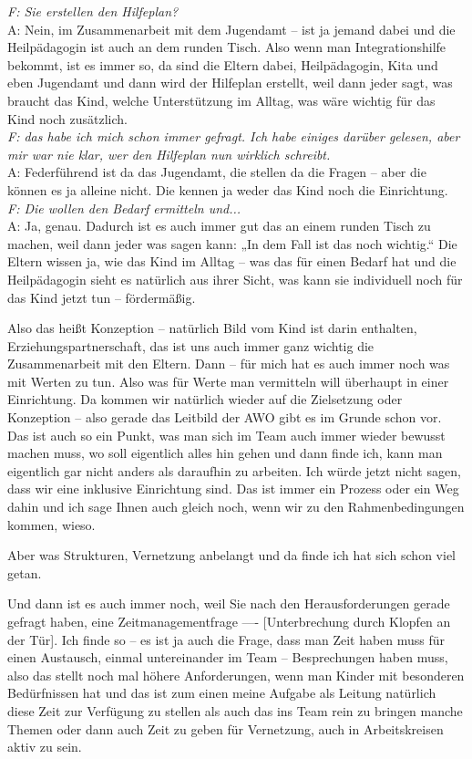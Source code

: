 \begin{linenumbers*}
\emph{F: Sie erstellen den Hilfeplan?}\\
A: Nein, im Zusammenarbeit mit dem Jugendamt -- ist ja jemand dabei und die Heilpädagogin ist auch an dem runden Tisch. Also wenn man Integrationshilfe bekommt, ist es immer so, da sind die Eltern dabei, Heilpädagogin, Kita und eben Jugendamt und dann wird der Hilfeplan erstellt, weil dann jeder sagt, was braucht das Kind, welche Unterstützung im Alltag, was wäre wichtig für das Kind noch zusätzlich. \\
\emph{F: das habe ich mich schon immer gefragt. Ich habe einiges darüber gelesen, aber mir war nie klar, wer den Hilfeplan nun wirklich schreibt.}\\
A: Federführend ist da das Jugendamt, die stellen da die Fragen -- aber die können es ja alleine nicht. Die kennen ja weder das Kind noch die Einrichtung.\\
\emph{F: Die wollen den Bedarf ermitteln und...}\\
A: Ja, genau. Dadurch ist es auch immer gut das an einem runden Tisch zu machen, weil dann jeder was sagen kann: „In dem Fall ist das noch wichtig.“ Die Eltern wissen ja, wie das Kind im Alltag -- was das für einen Bedarf hat und die Heilpädagogin sieht es natürlich aus ihrer Sicht, was kann sie individuell noch für das Kind jetzt tun -- fördermäßig. 

Also das heißt Konzeption -- natürlich Bild vom Kind ist darin enthalten, Erziehungspartnerschaft, das ist uns auch immer ganz wichtig die Zusammenarbeit mit den Eltern.
Dann -- für mich hat es auch immer noch was mit Werten zu tun. Also was für Werte man vermitteln will überhaupt in einer Einrichtung. Da kommen wir natürlich wieder auf die Zielsetzung oder Konzeption -- also gerade das Leitbild der AWO gibt es im Grunde schon vor.
Das ist auch so ein Punkt, was man sich im Team auch immer wieder bewusst machen muss, wo soll eigentlich alles hin gehen und dann finde ich, kann man eigentlich gar nicht anders als daraufhin zu arbeiten. 
Ich würde jetzt nicht sagen, dass wir eine inklusive Einrichtung sind. Das ist immer ein Prozess oder ein Weg dahin und ich sage Ihnen auch gleich noch, wenn 
wir zu den Rahmenbedingungen kommen, wieso. 

Aber was Strukturen, Vernetzung anbelangt und da finde ich hat sich schon viel getan. 

Und dann ist es auch immer noch, weil Sie nach den Herausforderungen gerade gefragt haben, eine Zeitmanagementfrage ---- {[Unterbrechung durch Klopfen an der Tür]}. Ich finde so -- es ist ja auch die Frage, dass man Zeit haben muss für einen Austausch, einmal untereinander im Team -- Besprechungen haben muss, also das stellt noch mal höhere Anforderungen, wenn man Kinder mit besonderen Bedürfnissen hat und das ist zum einen meine Aufgabe als Leitung natürlich diese Zeit zur Verfügung zu stellen als auch das ins Team rein zu bringen manche Themen oder dann auch Zeit zu geben für Vernetzung, auch in Arbeitskreisen aktiv zu sein. 


\end{linenumbers*}
